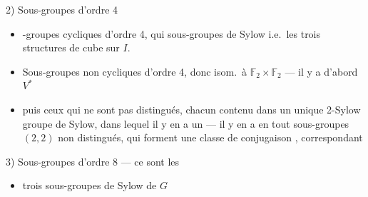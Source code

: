 \documentclass[11pt,a4paper]{article}
\begin{document}
2) Sous-groupes d'ordre 4
\begin{itemize}
  \item[c)]  -groupes cycliques d'ordre 4, qui
      sous-groupes de Sylow
    i.e.\ les trois structures de cube sur $I$.
  \item[d)] Sous-groupes non cycliques d'ordre 4, donc isom.\ à
    $\mathbb{F}_2 \times \mathbb{F}_2$ --- il y a d'abord $V^{*}$
  \item[e)] puis  ceux qui ne sont pas distingués, chacun contenu
    dans un unique 2-Sylow \struck{\ill{}}  \ill{} groupe de Sylow,
    dans lequel il y en a un  --- il
    y en a en tout   sous-groupes
     $(2,2)$ non distingués, qui
    forment une classe de conjugaison , correspondant \ill{}
\end{itemize}

3) Sous-groupes d'ordre 8 --- ce sont les
\begin{itemize}
  \item[f)] trois sous-groupes de Sylow de $G$
\end{itemize}
\end{document}
